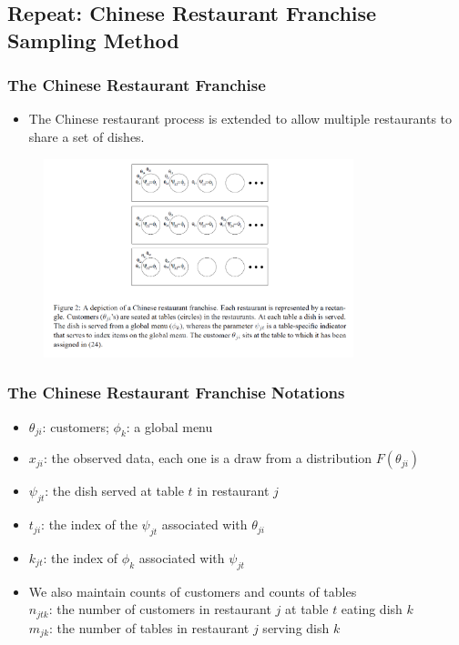 \documentclass{beamer}
\begin{document}
\subsection{\small{Repeat: Chinese Restaurant Franchise Sampling Method}}
	\begin{frame}
		\frametitle{The Chinese Restaurant Franchise}
		\begin{itemize}
			\item The Chinese restaurant process is extended to allow multiple restaurants to share a set of dishes.
		\end{itemize}
		\begin{figure}[H]
			\centering
			\includegraphics[width=9cm]{pic/2023-05-16 185245.png}
		\end{figure}
	\end{frame}
	\begin{frame}
		\frametitle{The Chinese Restaurant Franchise Notations}
		\begin{itemize}
			\item $\theta_{ji}$: customers; $\phi_k$: a global menu
			\item $x_{ji}$: the observed data, each one is a draw from a distribution $F(\theta_{ji})$
			\item $\psi_{jt}$: the dish served at table $t$ in restaurant $j$
			\item $t_{ji}$: the index of the $\psi_{jt}$ associated with $\theta_{ji}$
			\item  $k_{jt}$: the index of $\phi_k$ associated with $\psi_{jt}$
			\item We also maintain counts of customers and counts of tables \\ $n_{jtk}$: the number of customers in restaurant $j$ at table $t$ eating dish $k$ \\ $m_{jk}$: the number of tables in restaurant $j$ serving dish $k$
		\end{itemize}
	\end{frame}
\end{document}
